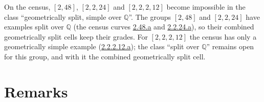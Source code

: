 \documentclass[11pt]{article}
\newcommand{\Q}{\mathbb Q}
\begin{document}
\medskip
On the census, \([2,48]\), \([2,2,24]\) and \([2,2,2,12]\) become impossible in the class ``geometrically split,
simple over \(\Q\)''. The groups \([2,48]\) and \([2,2,24]\) have examples split over \(\Q\) (the census curves
\href{https://genus-2-torsion.github.io/curve.html?id=2.48.a}{2.48.a} and
\href{https://genus-2-torsion.github.io/curve.html?id=2.2.24.a}{2.2.24.a}), so their combined geometrically split
cells keep their grades. For \([2,2,2,12]\) the census has only a geometrically simple example
(\href{https://genus-2-torsion.github.io/curve.html?id=2.2.2.12.a}{2.2.2.12.a}); the class ``split over \(\Q\)''
remains open for this group, and with it the combined geometrically split cell.

\section{Remarks}\label{remarks}
\end{document}
